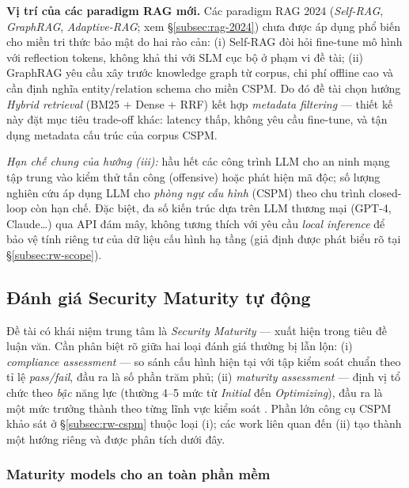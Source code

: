 \noindent\textbf{Vị trí của các paradigm RAG mới.} Các paradigm RAG 2024 (\textit{Self-RAG}, \textit{GraphRAG}, \textit{Adaptive-RAG}; xem §\ref{subsec:rag-2024}) chưa được áp dụng phổ biến cho miền tri thức bảo mật do hai rào cản: (i) Self-RAG đòi hỏi fine-tune mô hình với reflection tokens, không khả thi với SLM cục bộ ở phạm vi đề tài; (ii) GraphRAG yêu cầu xây trước knowledge graph từ corpus, chi phí offline cao và cần định nghĩa entity/relation schema cho miền CSPM. Do đó đề tài chọn hướng \textit{Hybrid retrieval} (BM25 + Dense + RRF) kết hợp \textit{metadata filtering} --- thiết kế này đặt mục tiêu trade-off khác: latency thấp, không yêu cầu fine-tune, và tận dụng metadata cấu trúc của corpus CSPM.

\noindent\textit{Hạn chế chung của hướng (iii):} hầu hết các công trình LLM cho an ninh mạng tập trung vào kiểm thử tấn công (offensive) hoặc phát hiện mã độc; số lượng nghiên cứu áp dụng LLM cho \textit{phòng ngự cấu hình} (CSPM) theo chu trình closed-loop còn hạn chế. Đặc biệt, đa số kiến trúc dựa trên LLM thương mại (GPT-4, Claude\dots) qua API đám mây, không tương thích với yêu cầu \textit{local inference} để bảo vệ tính riêng tư của dữ liệu cấu hình hạ tầng (giả định được phát biểu rõ tại §\ref{subsec:rw-scope}).

\subsection{Đánh giá Security Maturity tự động}
\label{subsec:rw-maturity}

Đề tài có khái niệm trung tâm là \textit{Security Maturity} --- xuất hiện trong tiêu đề luận văn. Cần phân biệt rõ giữa hai loại đánh giá thường bị lẫn lộn: (i) \textit{compliance assessment} --- so sánh cấu hình hiện tại với tập kiểm soát chuẩn theo tỉ lệ \textit{pass/fail}, đầu ra là số phần trăm phủ; (ii) \textit{maturity assessment} --- định vị tổ chức theo \textit{bậc} năng lực (thường 4--5 mức từ \textit{Initial} đến \textit{Optimizing}), đầu ra là một mức trưởng thành theo từng lĩnh vực kiểm soát \cite{sei_cmm_1993}. Phần lớn công cụ CSPM khảo sát ở §\ref{subsec:rw-cspm} thuộc loại (i); các work liên quan đến (ii) tạo thành một hướng riêng và được phân tích dưới đây.

\subsubsection*{Maturity models cho an toàn phần mềm}


